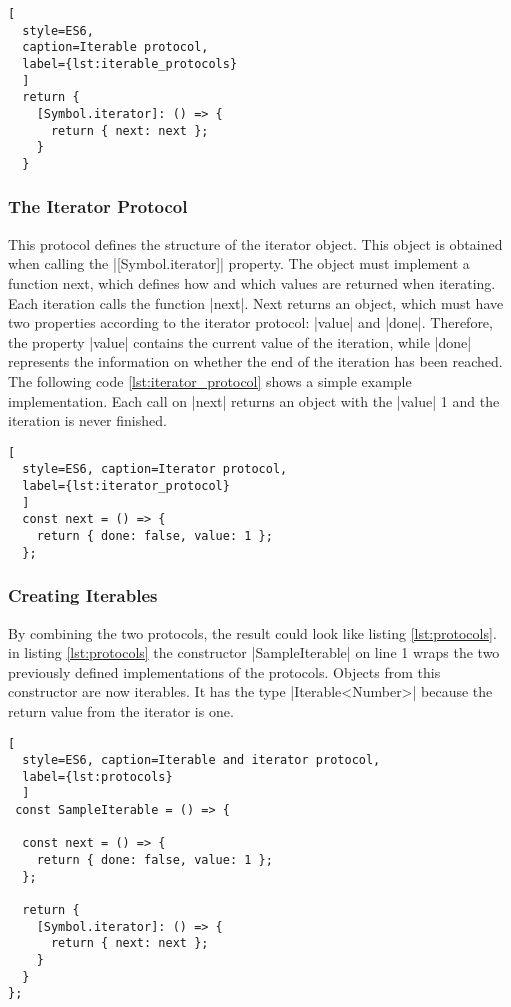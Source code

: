 \begin{lstlisting}[
  style=ES6, 
  caption=Iterable protocol,
  label={lst:iterable_protocols}
  ]
  return {
    [Symbol.iterator]: () => {
      return { next: next };
    }
  }
\end{lstlisting}

\subsubsection{The Iterator Protocol}
\label{subsub:The Iterator Protocol}
This protocol defines the structure of the iterator object. This object is
obtained when calling the |[Symbol.iterator]| property. The object must implement a
function next, which defines how and which values are returned when iterating.
Each iteration calls the function |next|. Next returns an object, which must
have two properties according to the iterator protocol: |value| and |done|.
Therefore, the property |value| contains the current value of the iteration,
while |done| represents the information on whether the end of the iteration has
been reached. The following code \ref{lst:iterator_protocol} shows a simple example implementation. 
Each call on |next| returns an object with the |value| 1 and the iteration is
never finished. 

\begin{lstlisting}[
  style=ES6, caption=Iterator protocol,
  label={lst:iterator_protocol}
  ]
  const next = () => {
    return { done: false, value: 1 };
  };
\end{lstlisting}

\subsubsection{Creating Iterables}
\label{subsub:Creating Iterables}
By combining the two protocols, the result could look like listing
\ref{lst:protocols}. in listing \ref{lst:protocols} the constructor 
|SampleIterable| on line 1 wraps the two previously
defined implementations of the protocols. Objects from this constructor are now
iterables. It has the type |Iterable<Number>| because the return value from the
iterator is one.

\begin{lstlisting}[
  style=ES6, caption=Iterable and iterator protocol,
  label={lst:protocols}
  ]
 const SampleIterable = () => {

  const next = () => {
    return { done: false, value: 1 };
  };

  return {
    [Symbol.iterator]: () => {
      return { next: next };
    }
  }
};
\end{lstlisting}

